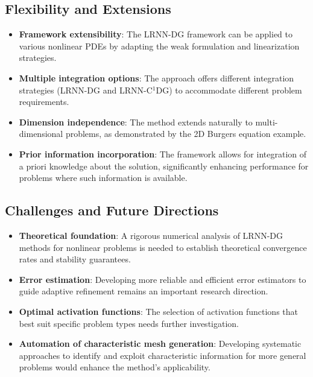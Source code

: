 \documentclass[11pt,a4paper]{article}
\begin{document}
\subsection{Flexibility and Extensions}

\begin{itemize}
    \item \textbf{Framework extensibility}: The LRNN-DG framework can be applied to various nonlinear PDEs by adapting the weak formulation and linearization strategies.
    
    \item \textbf{Multiple integration options}: The approach offers different integration strategies (LRNN-DG and LRNN-C$^1$DG) to accommodate different problem requirements.
    
    \item \textbf{Dimension independence}: The method extends naturally to multi-dimensional problems, as demonstrated by the 2D Burgers equation example.
    
    \item \textbf{Prior information incorporation}: The framework allows for integration of a priori knowledge about the solution, significantly enhancing performance for problems where such information is available.
\end{itemize}

\subsection{Challenges and Future Directions}

\begin{itemize}
    \item \textbf{Theoretical foundation}: A rigorous numerical analysis of LRNN-DG methods for nonlinear problems is needed to establish theoretical convergence rates and stability guarantees.
    
    \item \textbf{Error estimation}: Developing more reliable and efficient error estimators to guide adaptive refinement remains an important research direction.
    
    \item \textbf{Optimal activation functions}: The selection of activation functions that best suit specific problem types needs further investigation.
    
    \item \textbf{Automation of characteristic mesh generation}: Developing systematic approaches to identify and exploit characteristic information for more general problems would enhance the method's applicability.
\end{itemize}
\end{document}
